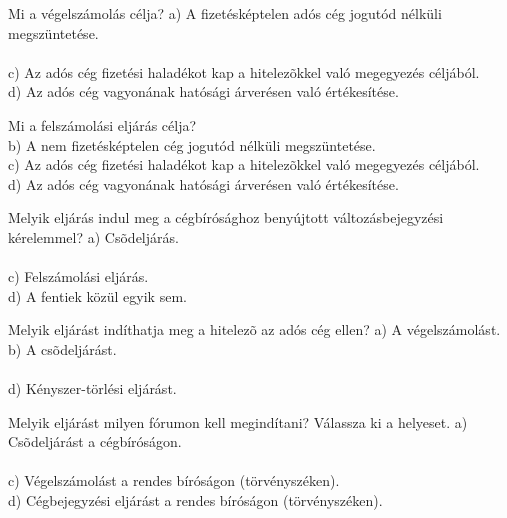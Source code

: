 \begin{frame}

\begin{tcolorbox}[title={106. Kérdés}]
Mi a végelszámolás célja?
\tcblower
a) A fizetésképtelen adós cég jogutód nélküli megszüntetése.\\
\\
c) Az adós cég fizetési haladékot kap a hitelezõkkel való megegyezés céljából.\\
d) Az adós cég vagyonának hatósági árverésen való értékesítése.
\end{tcolorbox}

\begin{tcolorbox}[title={107. Kérdés}]
Mi a felszámolási eljárás célja?
\tcblower
{}\\
b) A nem fizetésképtelen cég jogutód nélküli megszüntetése.\\
c) Az adós cég fizetési haladékot kap a hitelezõkkel való megegyezés céljából.\\
d) Az adós cég vagyonának hatósági árverésen való értékesítése.
\end{tcolorbox}

\begin{tcolorbox}[title={108. Kérdés}]
Melyik eljárás indul meg a cégbírósághoz benyújtott változásbejegyzési kérelemmel?
\tcblower
a) Csõdeljárás.\\
\\
c) Felszámolási eljárás.\\
d) A fentiek közül egyik sem.
\end{tcolorbox}

\begin{tcolorbox}[title={109. Kérdés}]
Melyik eljárást indíthatja meg a hitelezõ az adós cég ellen?
\tcblower
a) A végelszámolást.\\
b) A csõdeljárást.\\
\\
d) Kényszer-törlési eljárást.
\end{tcolorbox}

\end{frame}


\begin{frame}

\begin{tcolorbox}[title={110. Kérdés}]
Melyik eljárást milyen fórumon kell megindítani? Válassza ki a helyeset.
\tcblower
a) Csõdeljárást a cégbíróságon.\\
\\
c) Végelszámolást a rendes bíróságon (törvényszéken).\\
d) Cégbejegyzési eljárást a rendes bíróságon (törvényszéken).
\end{tcolorbox}

\end{frame}

